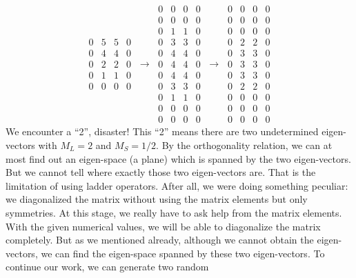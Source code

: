 \begin{equation*}
\begin{matrix}
0 & 5 & 5 & 0 \\ 
0 & 4 & 4 & 0 \\ 
0 & 2 & 2 & 0 \\ 
0 & 1 & 1 & 0 \\ 
0 & 0 & 0 & 0
\end{matrix}
\ \rightarrow \
\begin{matrix}
0 & 0 & 0 & 0 \\ 
0 & 0 & 0 & 0 \\ 
0 & 1 & \boxed{1} & 0 \\ 
0 & 3 & 3 & 0 \\ 
0 & 4 & 4 & 0 \\ 
0 & 4 & 4 & 0 \\ 
0 & 4 & 4 & 0 \\ 
0 & 3 & 3 & 0 \\ 
0 & 1 & 1 & 0 \\ 
0 & 0 & 0 & 0 \\ 
0 & 0 & 0 & 0
\end{matrix}
\ \rightarrow \
\begin{matrix}
0 & 0 & 0 & 0 \\ 
0 & 0 & 0 & 0 \\ 
0 & 0 & 0 & 0 \\ 
0 & 2 & \boxed{2} & 0 \\ 
0 & 3 & 3 & 0 \\ 
0 & 3 & 3 & 0 \\ 
0 & 3 & 3 & 0 \\ 
0 & 2 & 2 & 0 \\ 
0 & 0 & 0 & 0 \\ 
0 & 0 & 0 & 0 \\ 
0 & 0 & 0 & 0
\end{matrix}
\end{equation*}
%
We encounter a ``2'', disaster! This ``2'' means there are two undetermined
eigen-vectors with $M_L=2$ and $M_S=1/2$. By the orthogonality relation,
we can at most find out an eigen-space (a plane) which is spanned by the two eigen-vectors.
But we cannot tell where exactly those two eigen-vectors are. That is the
limitation of using ladder operators. After all, we were doing something
peculiar: we diagonalized the matrix without using the matrix elements but only symmetries.
At this stage, we really have to ask help from the matrix elements. With the given
numerical values, we will be able to diagonalize the matrix completely.
But as we mentioned already, although we cannot obtain the eigen-vectors,
we can find the eigen-space spanned by these two eigen-vectors. To continue our work, we can generate two random
